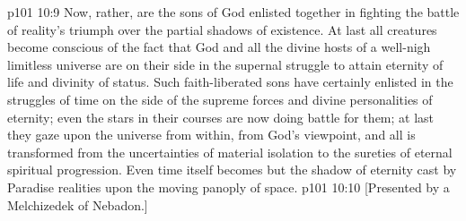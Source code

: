 \vs p101 10:9 Now, rather, are the sons of God enlisted together in fighting the battle of reality’s triumph over the partial shadows of existence. At last all creatures become conscious of the fact that God and all the divine hosts of a well\hyp{}nigh limitless universe are on their side in the supernal struggle to attain eternity of life and divinity of status. Such faith\hyp{}liberated sons have certainly enlisted in the struggles of time on the side of the supreme forces and divine personalities of eternity; even the stars in their courses are now doing battle for them; at last they gaze upon the universe from within, from God’s viewpoint, and all is transformed from the uncertainties of material isolation to the sureties of eternal spiritual progression. Even time itself becomes but the shadow of eternity cast by Paradise realities upon the moving panoply of space.
\vsetoff
\vs p101 10:10 [Presented by a Melchizedek of Nebadon.]
\quizlink
